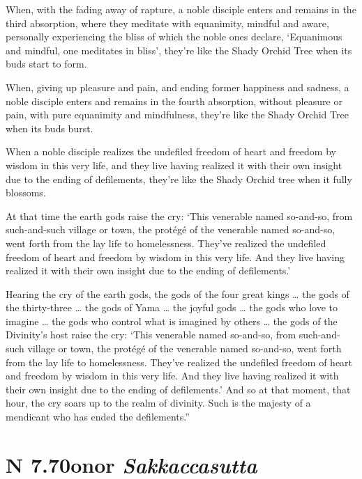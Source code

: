 \documentclass[12pt,openany]{book}%
\newcommand*{\suttatitleacronym}[1]{\smaller[2]{#1}\vspace*{.3em}}
\newcommand*{\suttatitletranslation}[1]{\linebreak{#1}}
\newcommand*{\suttatitleroot}[1]{\linebreak\smaller[2]\itshape{#1}}
\newcommand*{\tocacronym}[1]{\hspace*{-3.3em}{#1}\quad}
\newcommand*{\toctranslation}[1]{#1}
\newcommand*{\tocroot}[1]{(\textit{#1})}
\begin{document}
When, with the fading away of rapture, a noble disciple enters and remains in the third absorption, where they meditate with equanimity, mindful and aware, personally experiencing the bliss of which the noble ones declare, ‘Equanimous and mindful, one meditates in bliss’, they’re like the Shady Orchid Tree when its buds start to form. 

When, giving up pleasure and pain, and ending former happiness and sadness, a noble disciple enters and remains in the fourth absorption, without pleasure or pain, with pure equanimity and mindfulness, they’re like the Shady Orchid Tree when its buds burst. 

When a noble disciple realizes the undefiled freedom of heart and freedom by wisdom in this very life, and they live having realized it with their own insight due to the ending of defilements, they’re like the Shady Orchid tree when it fully blossoms. 

At that time the earth gods raise the cry: ‘This venerable named so-and-so, from such-and-such village or town, the protégé of the venerable named so-and-so, went forth from the lay life to homelessness. They’ve realized the undefiled freedom of heart and freedom by wisdom in this very life. And they live having realized it with their own insight due to the ending of defilements.’ 

Hearing the cry of the earth gods, the gods of the four great kings … the gods of the thirty-three … the gods of Yama … the joyful gods … the gods who love to imagine … the gods who control what is imagined by others … the gods of the Divinity’s host raise the cry: ‘This venerable named so-and-so, from such-and-such village or town, the protégé of the venerable named so-and-so, went forth from the lay life to homelessness. They’ve realized the undefiled freedom of heart and freedom by wisdom in this very life. And they live having realized it with their own insight due to the ending of defilements.’ And so at that moment, that hour, the cry soars up to the realm of divinity. Such is the majesty of a mendicant who has ended the defilements.” 

%
\section*{{\suttatitleacronym AN 7.70}{\suttatitletranslation Honor }{\suttatitleroot Sakkaccasutta}}
\addcontentsline{toc}{section}{\tocacronym{AN 7.70} \toctranslation{Honor } \tocroot{Sakkaccasutta}}
\end{document}
